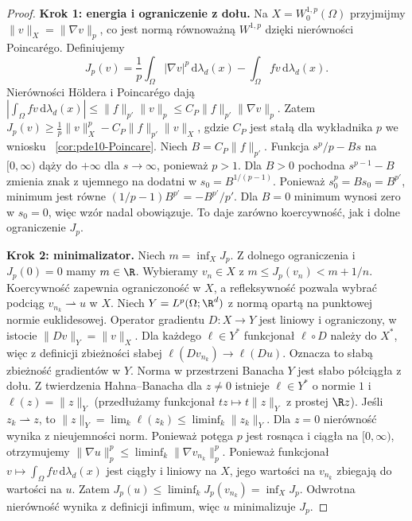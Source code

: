 \begin{proof}
\textbf{Krok 1: energia i ograniczenie z dołu.}
Na $X=W_0^{1,p}(\Omega)$ przyjmijmy
$\|v\|_X=\|\nabla v\|_p$, co jest normą równoważną
$W^{1,p}$ dzięki nierówności Poincar\'ego.
Definiujemy
\[ J_p(v)=\frac1p\int_\Omega|\nabla v|^p
\,\mathrm d\lambda_d(x)-\int_\Omega fv
\,\mathrm d\lambda_d(x). \]
Nierówności Höldera i Poincarégo dają
$|\int_\Omega fv\,\mathrm d\lambda_d(x)|\le\|f\|_{p'}\|v\|_p
\le C_P\|f\|_{p'}\|\nabla v\|_p$.
Zatem
$J_p(v)\ge\frac1p\|v\|_X^p-C_P\|f\|_{p'}\|v\|_X$,
gdzie $C_P$ jest stałą dla wykładnika $p$ we wniosku
~\ref{cor:pde10-Poincare}. Niech $B=C_P\|f\|_{p'}$.
Funkcja $s^p/p-Bs$ na $[0,\infty)$ dąży do
$+\infty$ dla $s\to\infty$, ponieważ $p>1$.
Dla $B>0$ pochodna $s^{p-1}-B$ zmienia znak
z ujemnego na dodatni w $s_0=B^{1/(p-1)}$.
Ponieważ $s_0^p=Bs_0=B^{p'}$, minimum jest równe
$(1/p-1)B^{p'}=-B^{p'}/p'$. Dla $B=0$ minimum
wynosi zero w $s_0=0$, więc wzór nadal obowiązuje.
To daje zarówno koercywność, jak i dolne ograniczenie $J_p$.

\textbf{Krok 2: minimalizator.}
Niech $m=\inf_X J_p$. Z dolnego ograniczenia i
$J_p(0)=0$ mamy $m\in\R$. Wybieramy $v_n\in X$
z $m\le J_p(v_n)<m+1/n$.
Koercywność zapewnia ograniczoność w $X$,
a refleksywność pozwala wybrać podciąg
$v_{n_k}\rightharpoonup u$ w $X$.
Niech $Y=L^p(\Omega;\R^d)$ z normą opartą
na punktowej normie euklidesowej.
Operator gradientu $D:X\to Y$ jest liniowy
i ograniczony, w istocie $\|Dv\|_Y=\|v\|_X$.
Dla każdego $\ell\in Y^*$ funkcjonał $\ell\circ D$
należy do $X^*$, więc z definicji zbieżności słabej
$\ell(Dv_{n_k})\to\ell(Du)$. Oznacza to słabą
zbieżność gradientów w $Y$.
Norma w przestrzeni Banacha $Y$ jest słabo
półciągła z dołu. Z twierdzenia Hahna--Banacha
dla $z\ne0$ istnieje $\ell\in Y^*$ o normie $1$
i $\ell(z)=\|z\|_Y$ (przedłużamy funkcjonał
$t z\mapsto t\|z\|_Y$ z prostej $\R z$).
Jeśli $z_k\rightharpoonup z$, to
$\|z\|_Y=\lim_k\ell(z_k)\le\liminf_k\|z_k\|_Y$.
Dla $z=0$ nierówność wynika z nieujemności norm.
Ponieważ potęga $p$ jest rosnąca i ciągła na
$[0,\infty)$, otrzymujemy
$\|\nabla u\|_p^p\le\liminf_k\|\nabla v_{n_k}\|_p^p$.
Ponieważ funkcjonał $v\mapsto\int_\Omega fv\,\mathrm d\lambda_d(x)$ jest
ciągły i liniowy na $X$, jego wartości na $v_{n_k}$
zbiegają do wartości na $u$. Zatem
$J_p(u)\le\liminf_kJ_p(v_{n_k})=\inf_XJ_p$.
Odwrotna nierówność wynika z definicji infimum,
więc $u$ minimalizuje $J_p$.


\end{proof}
